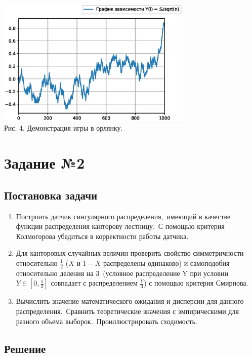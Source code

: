 \documentclass[11pt]{article}
\begin{document}
	\begin{center}
		\includegraphics[width=0.7\textwidth]{1_4.eps}\\
		{Рис. 4. Демонстрация игры в орлянку.}
	\end{center}

\newpage
	\section{Задание №2}
	\subsection{Постановка задачи}
	\begin{enumerate}
		\item Построить датчик сингулярного распределения,\ имеющий в качестве функции распределения канторову лестницу.\ С помощью критерия Колмогорова убедиться в корректности работы датчика.
		\item Для канторовых случайных величин проверить свойство симметричности относительно {$\frac{1}{2}$} ({$X$}  и {$1 - X$} распределены одинаково) и самоподобия относительно деления на 3\ (условное распределение Y при условии {$Y \in[0,\frac{1}{3}]$} совпадает с распределением {$\frac{Y}{3}$}) с помощью критерия Смирнова.
		\item Вычислить значение математического ожидания и дисперсии для данного распределения.\ Сравнить теоретические значения с эмпирическими для разного объема выборок.\ Проиллюстрировать сходимость. 
	\end{enumerate}
	
	\subsection{Решение}
\end{document}
